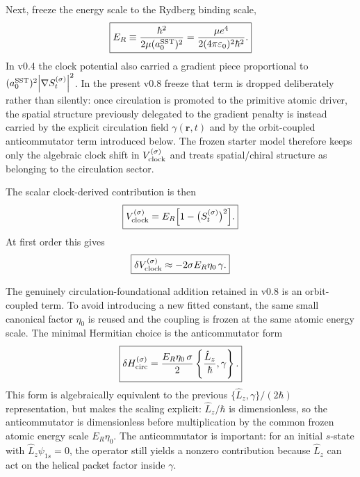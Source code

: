 \documentclass[11pt,a4paper]{article}
\begin{document}
Next, freeze the energy scale to the Rydberg binding scale,
\begin{equation}
\label{eq:ERfreeze}
\boxed{
E_R \equiv \frac{\hbar^2}{2\mu (a_0^{\rm SST})^2}
= \frac{\mu e^4}{2(4\pi\varepsilon_0)^2\hbar^2}.
}
\end{equation}
In v0.4 the clock potential also carried a gradient piece proportional to $(a_0^{\rm SST})^2\abs{\nabla S_t^{(\sigma)}}^2$. In the present v0.8 freeze that term is dropped deliberately rather than silently: once circulation is promoted to the primitive atomic driver, the spatial structure previously delegated to the gradient penalty is instead carried by the explicit circulation field $\gamma(\mathbf r,t)$ and by the orbit-coupled anticommutator term introduced below. The frozen starter model therefore keeps only the algebraic clock shift in $V_{\rm clock}^{(\sigma)}$ and treats spatial/chiral structure as belonging to the circulation sector.

The scalar clock-derived contribution is then
\begin{equation}
\label{eq:Vclock}
\boxed{
V_{\rm clock}^{(\sigma)}
=
E_R\Bigl[1-\bigl(S_t^{(\sigma)}\bigr)^2\Bigr].
}
\end{equation}
At first order this gives
\begin{equation}
\label{eq:Vclock-linear}
\boxed{
\delta V_{\rm clock}^{(\sigma)}
\approx
-2\sigma E_R\eta_0\,\gamma.
}
\end{equation}

The genuinely circulation-foundational addition retained in v0.8 is an orbit-coupled term. To avoid introducing a new fitted constant, the same small canonical factor $\eta_0$ is reused and the coupling is frozen at the same atomic energy scale. The minimal Hermitian choice is the anticommutator form
\begin{equation}
\label{eq:HintCirc}
\boxed{
\delta H_{\rm circ}^{(\sigma)}
=
\frac{E_R\eta_0\,\sigma}{2}
\left\{\frac{\hat L_z}{\hbar},\gamma\right\}.
}
\end{equation}
This form is algebraically equivalent to the previous $\{\hat L_z,\gamma\}/(2\hbar)$ representation, but makes the scaling explicit: $\hat L_z/\hbar$ is dimensionless, so the anticommutator is dimensionless before multiplication by the common frozen atomic energy scale $E_R\eta_0$. The anticommutator is important: for an initial $s$-state with $\hat L_z\psi_{1s}=0$, the operator still yields a nonzero contribution because $\hat L_z$ can act on the helical packet factor inside $\gamma$.
\end{document}
